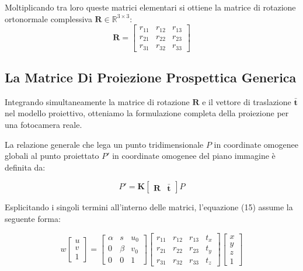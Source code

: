﻿\documentclass[11pt, a4paper]{article}
\begin{document}
Moltiplicando tra loro queste matrici elementari si ottiene la matrice di rotazione ortonormale complessiva $\bm{R} \in \mathbb{R}^{3 \times 3}$:
\[
\bm{R} = \begin{bmatrix} r_{11} & r_{12} & r_{13} \\ r_{21} & r_{22} & r_{23} \\ r_{31} & r_{32} & r_{33} \end{bmatrix}
\]



\subsection{La Matrice Di Proiezione Prospettica Generica}

Integrando simultaneamente la matrice di rotazione $\bm{R}$ e il vettore di traslazione $\bar{\bm{t}}$ nel modello proiettivo, otteniamo la formulazione completa della proiezione per una fotocamera reale.


La relazione generale che lega un punto tridimensionale $P$ in coordinate omogenee globali al punto proiettato $P'$ in coordinate omogenee del piano immagine è definita da:

\begin{equation}
\boxed{P' = \bm{K} \begin{bmatrix} \bm{R} & \bar{\bm{t}} \end{bmatrix} P}
\end{equation}

Esplicitando i singoli termini all'interno delle matrici, l'equazione (15) assume la seguente forma:

\begin{equation}
w \begin{bmatrix} u \\ v \\ 1 \end{bmatrix} = \begin{bmatrix} \alpha & s & u_0 \\ 0 & \beta & v_0 \\ 0 & 0 & 1 \end{bmatrix} \begin{bmatrix} r_{11} & r_{12} & r_{13} & t_x \\ r_{21} & r_{22} & r_{23} & t_y \\ r_{31} & r_{32} & r_{33} & t_z \end{bmatrix} \begin{bmatrix} x \\ y \\ z \\ 1 \end{bmatrix}
\end{equation}
\end{document}

